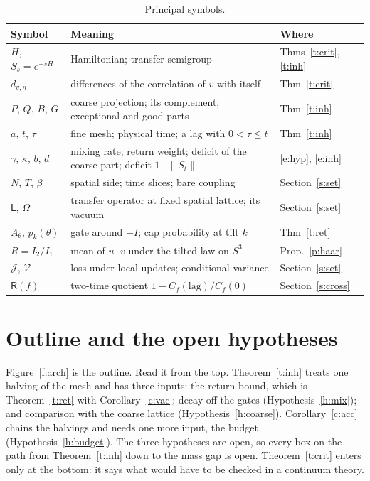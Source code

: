 \begin{table}[ht]
\centering\small
\begin{tabular}{@{}lll@{}}
\toprule
Symbol & Meaning & Where \\
\midrule
$H$, $S_s=e^{-sH}$ & Hamiltonian; transfer semigroup & Thms~\ref{t:crit}, \ref{t:inh} \\
$d_{v,n}$ & differences of the correlation of $v$ with itself & Thm~\ref{t:crit} \\
$P$, $Q$, $B$, $G$ & coarse projection; its complement; exceptional and good parts & Thm~\ref{t:inh} \\
$a$, $t$, $\tau$ & fine mesh; physical time; a lag with $0<\tau\le t$ & Thm~\ref{t:inh} \\
$\gamma$, $\kappa$, $b$, $d$ & mixing rate; return weight; deficit of the coarse part; deficit $1-\|S_t\|$ & \eqref{e:hyp}, \eqref{e:inh} \\
$N$, $T$, $\beta$ & spatial side; time slices; bare coupling & Section~\ref{s:set} \\
$\mathsf L$, $\Omega$ & transfer operator at fixed spatial lattice; its vacuum & Section~\ref{s:set} \\
$A_\theta$, $p_k(\theta)$ & gate around $-I$; cap probability at tilt $k$ & Thm~\ref{t:ret} \\
$R=I_2/I_1$ & mean of $u\cdot v$ under the tilted law on $S^3$ & Prop.~\ref{p:haar} \\
$\mathcal J$, $\mathcal V$ & loss under local updates; conditional variance & Section~\ref{s:set} \\
$\mathsf R(f)$ & two-time quotient $1-C_f(\text{lag})/C_f(0)$ & Section~\ref{s:cross} \\
\bottomrule
\end{tabular}
\caption{Principal symbols.}\label{tab:sym}
\end{table}

\section{Outline and the open hypotheses}\label{s:arch}
Figure~\ref{f:arch} is the outline. Read it from the top. Theorem~\ref{t:inh} treats one halving of the mesh and
has three inputs: the return bound, which is Theorem~\ref{t:ret} with Corollary~\ref{c:vac}; decay off the
gates (Hypothesis~\ref{h:mix}); and comparison with the coarse lattice (Hypothesis~\ref{h:coarse}).
Corollary~\ref{c:acc} chains the halvings and needs one more input, the budget (Hypothesis~\ref{h:budget}). The
three hypotheses are open, so every box on the path from Theorem~\ref{t:inh} down to the mass gap is open.
Theorem~\ref{t:crit} enters only at the bottom: it says what would have to be checked in a continuum theory.

